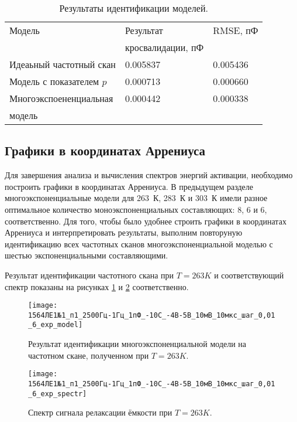 	\begin{table}[!htp]
	\centering
	\caption{Результаты идентификации моделей.}
	\begin{tabular}{|l|l|l|}
		\hline
		Модель                    & Результат         & RMSE, пФ \\ 
		                          & кросвалидации, пФ &          \\ \hline
		Идеаьный частотный скан   & 0.005837          & 0.005436 \\ \hline
		Модель с показателем $p$  & 0.000713          & 0.000660 \\ \hline
		Многоэкспоененциальная    & 0.000442          & 0.000338 \\
		модель                    &                   &          \\ \hline
	\end{tabular}
	\label{table:model_comparison_303}
	\end{table}


	\newpage
	\subsection{Графики в координатах Аррениуса}
	Для завершения анализа и вычисления спектров энергий активации, необходимо
	построить графики в координатах Аррениуса. В предыдущем разделе 
	многоэкспоненциальные модели для 263~К, 283~К и 303~К имели разное 
	оптимальное количество моноэкспоненциальных составляющих: 8, 6 и 6, 
	соответственно. Для того, чтобы	было удобнее строить графики в координатах 
	Аррениуса и интерпретировать результаты, выполним повторуную идентификацию 
	всех частотных сканов многоэкспоненциальной моделью с шестью 
	экспоненциальными составляющими.

	Результат идентификации частотного скана при $T=263 K$ и соответствующий
	спектр показаны на рисунках \ref{pic:6_exp_model_263} и 
	\ref{pic:6_exp_spectr_263} соответственно.

	\begin{figure}[!htp]
		\centering
		\texttt{[image: 1564ЛЕ1№1\_п1\_2500Гц-1Гц\_1пФ\_-10С\_-4В-5В\_10мВ\_10мкс\_шаг\_0,01\_6\_exp\_model]}
		\caption{Результат идентификации многоэкспоненциальной модели на 
		частотном скане, полученном при $T=263 K$.}
		\label{pic:6_exp_model_263}
	\end{figure}

	\begin{figure}[!htp]
		\centering
		\texttt{[image: 1564ЛЕ1№1\_п1\_2500Гц-1Гц\_1пФ\_-10С\_-4В-5В\_10мВ\_10мкс\_шаг\_0,01\_6\_exp\_spectr]}
		\caption{Спектр сигнала релаксации ёмкости при $T=263 K$.}
		\label{pic:6_exp_spectr_263}
	\end{figure}

